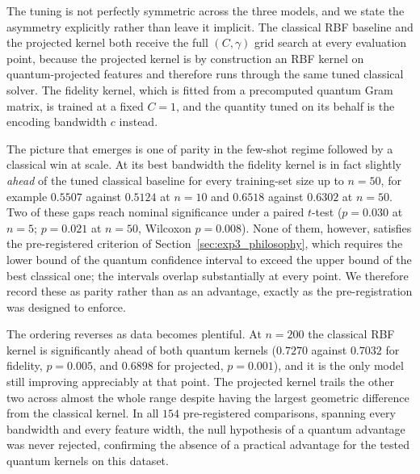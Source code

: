 The tuning is not perfectly symmetric across the three models, and we state the asymmetry explicitly rather than leave it implicit. The classical RBF baseline and the projected kernel both receive the full $(C, \gamma)$ grid search at every evaluation point, because the projected kernel is by construction an RBF kernel on quantum-projected features and therefore runs through the same tuned classical solver. The fidelity kernel, which is fitted from a precomputed quantum Gram matrix, is trained at a fixed $C = 1$, and the quantity tuned on its behalf is the encoding bandwidth $c$ instead.

The picture that emerges is one of parity in the few-shot regime followed by a classical
win at scale. At its best bandwidth the fidelity kernel is in fact slightly \emph{ahead} of
the tuned classical baseline for every training-set size up to $n = 50$, for example
$0.5507$ against $0.5124$ at $n = 10$ and $0.6518$ against $0.6302$ at $n = 50$. Two of
these gaps reach nominal significance under a paired $t$-test ($p = 0.030$ at $n=5$;
$p = 0.021$ at $n=50$, Wilcoxon $p = 0.008$). None of them, however, satisfies the
pre-registered criterion of Section~\ref{sec:exp3_philosophy}, which requires the lower
bound of the quantum confidence interval to exceed the upper bound of the best classical
one; the intervals overlap substantially at every point. We therefore record these as
parity rather than as an advantage, exactly as the pre-registration was designed to
enforce.

The ordering reverses as data becomes plentiful. At $n = 200$ the classical RBF kernel is
significantly ahead of both quantum kernels ($0.7270$ against $0.7032$ for fidelity,
$p = 0.005$, and $0.6898$ for projected, $p = 0.001$), and it is the only model still
improving appreciably at that point. The projected kernel trails the other two across
almost the whole range despite having the largest geometric difference from the classical
kernel. In all $154$ pre-registered comparisons, spanning every bandwidth and every feature
width, the null hypothesis of a quantum advantage was never rejected, confirming the
absence of a practical advantage for the tested quantum kernels on this dataset.

